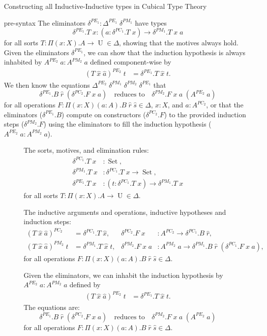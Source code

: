 \documentclass[acmsmall,review]{acmart}\settopmatter{printfolios=true,printccs=false,printacmref=false}
\DeclareMathOperator{\USet}{Set}
\DeclareMathOperator{\UU}{U}
\begin{document}
\begin{section}{Constructing all Inductive-Inductive types in Cubical Type Theory}
\begin{subsection}{pre-syntax}
The eliminators $\delta^{PE_1} : \Delta^{PE_1}\;\delta^{PM_1}$ have types \[\delta^{PE_1}.T\;x : (a : \delta^{PC_1}.T\;x) \to \delta^{PM_1}.T\;x\;a\] for all sorts $T : \Pi(x : X).A\to\UU \in\Delta$, showing that the motives always hold. Given the eliminators $\delta^{PE_1}$, we can show that the induction hypothesis is always inhabited by $A^{PE_2}\;a : A^{PM_2}\;a$ defined component-wise by \begin{align*}(T\;\hat{x}\;\hat{a})^{PE_2}\;t &= \delta^{PE_1}.T\;\hat{x}\;t.\end{align*} We then know the equations $\Delta^{PE_2}\;\delta^{PM_1}\;\delta^{PM_2}\;\delta^{PE_1}$ that \[\delta^{PE_1}.B\;\hat{r}\;(\delta^{PC_2}.F\;x\;a)\quad\text{reduces to}\quad \delta^{PM_2}.F\;x\;a\;(A^{PE_2}\;a)\] for all operations $F : \Pi(x : X)(a : A).B\;\hat{r}\;\hat{s} \in \Delta$, $x : X$, and $a : A^{PC_2}$, or that the eliminators ($\delta^{PE_1}.B$) compute on constructors ($\delta^{PC_2}.F$) to the provided induction steps ($\delta^{PM_2}.F$) using the eliminators to fill the induction hypothesis ($A^{PE_2}\;a : A^{PM_2}\;a$).

\begin{figure}[htpb]
    \begin{flushleft}
    The sorts, motives, and elimination rules:
    \begin{align*}
    \delta^{PC_1}.T\;x &: \USet,\\
    \delta^{PM_1}.T\;x &: \delta^{PC_1}.T\;x \to \USet,\\
    \delta^{PE_1}.T\;x &: (t : \delta^{PC_1}.T\;x) \to \delta^{PM_1}.T\;x
    \end{align*}
    for all sorts $T : \Pi(x : X).A\to\UU \in\Delta$.
    
    The inductive arguments and operations, inductive hypotheses and induction steps:
    \begin{align*}
    (T\;\hat{x}\;\hat{a})^{PC_2} &= \delta^{PC_1}.T\;\hat{x},
    &\delta^{PC_2}.F\;x &: A^{PC_2} \to \delta^{PC_1}.B\;\hat{r},\\
    (T\;\hat{x}\;\hat{a})^{PM_2}\;t &= \delta^{PM_1}.T\;\hat{x}\;t,
    &\delta^{PM_2}.F\;x\;a &: A^{PM_2}\;a \to \delta^{PM_1}.B\;\hat{r}\;(\delta^{PC_1}.F\;x\;a),
    \end{align*}
    for all operations $F : \Pi(x : X)(a : A).B\;\hat{r}\;\hat{s} \in \Delta$.
    
    Given the eliminators, we can inhabit the induction hypothesis by $A^{PE_2}\;a : A^{PM_2}\;a$ defined by
    \begin{align*}
    (T\;\hat{x}\;\hat{a})^{PE_2}\;t &= \delta^{PE_1}.T\;\hat{x}\;t.
    \end{align*}
    The equations are:
    \[\delta^{PE_1}.B\;\hat{r}\;(\delta^{PC_2}.F\;x\;a)\quad\text{reduces to}\quad \delta^{PM_2}.F\;x\;a\;(A^{PE_2}\;a)\]
    for all operations $F : \Pi(x : X)(a : A).B\;\hat{r}\;\hat{s} \in \Delta$.
    

\end{flushleft}
\end{figure}
\end{subsection}
\end{section}
\end{document}
